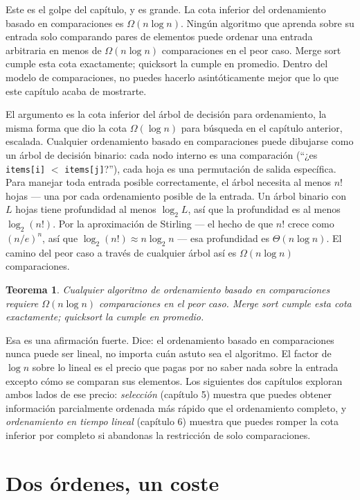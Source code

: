 \documentclass[11pt,a4paper]{article}
\newtheorem{teorema}{Teorema}
\begin{document}
Este es el golpe del capítulo, y es grande. La cota inferior del ordenamiento basado en comparaciones es $\Omega(n \log n)$. Ningún algoritmo que aprenda sobre su entrada solo comparando pares de elementos puede ordenar una entrada arbitraria en menos de $\Omega(n \log n)$ comparaciones en el peor caso. Merge sort cumple esta cota exactamente; quicksort la cumple en promedio. Dentro del modelo de comparaciones, no puedes hacerlo asintóticamente mejor que lo que este capítulo acaba de mostrarte.

El argumento es la cota inferior del árbol de decisión para ordenamiento, la misma forma que dio la cota $\Omega(\log n)$ para búsqueda en el capítulo anterior, escalada. Cualquier ordenamiento basado en comparaciones puede dibujarse como un árbol de decisión binario: cada nodo interno es una comparación (``¿es \texttt{items[i]} $<$ \texttt{items[j]}?''), cada hoja es una permutación de salida específica. Para manejar toda entrada posible correctamente, el árbol necesita al menos $n!$ hojas --- una por cada ordenamiento posible de la entrada. Un árbol binario con $L$ hojas tiene profundidad al menos $\log_2 L$, así que la profundidad es al menos $\log_2(n!)$. Por la aproximación de Stirling --- el hecho de que $n!$ crece como $(n/e)^n$, así que $\log_2(n!) \approx n \log_2 n$ --- esa profundidad es $\Theta(n \log n)$. El camino del peor caso a través de cualquier árbol así es $\Omega(n \log n)$ comparaciones.

\begin{teorema}
Cualquier algoritmo de ordenamiento basado en comparaciones requiere $\Omega(n \log n)$ comparaciones en el peor caso. Merge sort cumple esta cota exactamente; quicksort la cumple en promedio.
\end{teorema}

Esa es una afirmación fuerte. Dice: el ordenamiento basado en comparaciones nunca puede ser lineal, no importa cuán astuto sea el algoritmo. El factor de $\log n$ sobre lo lineal es el precio que pagas por no saber nada sobre la entrada excepto cómo se comparan sus elementos. Los siguientes dos capítulos exploran ambos lados de ese precio: \emph{selección} (capítulo 5) muestra que puedes obtener información parcialmente ordenada más rápido que el ordenamiento completo, y \emph{ordenamiento en tiempo lineal} (capítulo 6) muestra que puedes romper la cota inferior por completo si abandonas la restricción de solo comparaciones.

\section{Dos órdenes, un coste}
\end{document}
